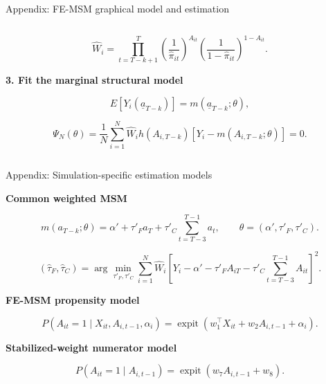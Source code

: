\documentclass[aspectratio=169,12pt]{beamer}
\newcommand{\muted}[1]{\textcolor{PrimerMuted}{#1}}
\newcommand{\pstrong}[1]{{\bfseries #1}}
\newcommand{\arrowtext}[1]{\par\vspace{0.45em}\noindent{\fontsize{10}{12}\selectfont $\to$}\hspace{0.45em}{#1}\par}
\newcommand{\smallref}[1]{\vspace{0.15cm}{\fontsize{5.8}{7}\selectfont\muted{#1}}}
\begin{document}
\begin{frame}{Appendix: FE-MSM graphical model and estimation}
\begin{columns}[T,onlytextwidth]
\begin{column}{0.50\textwidth}
{\vspace{-0.20cm}
\[
\widehat W_i
=
\prod_{t=T-k+1}^{T}
\left(\frac{1}{\hat\pi_{it}}\right)^{A_{it}}
\left(\frac{1}{1-\hat\pi_{it}}\right)^{1-A_{it}}.
\]

\vspace{0.05cm}
\pstrong{3. Fit the marginal structural model}

\vspace{-0.18cm}
\[
E[Y_i(\underline{a}_{T-k})]=m(\underline{a}_{T-k};\theta),
\]

\vspace{-0.18cm}
\[
\Psi_N(\theta)
=
\frac{1}{N}\sum_{i=1}^{N}
\widehat W_i
h(A_{i,T-k})
\left[
Y_i-m(A_{i,T-k};\theta)
\right]
=0.
\]

\vspace{-0.25cm}
\arrowtext{For a linear MSM, this last step reduces to a weighted least squares regression of \(Y_i\) on the truncated treatment history.}

}

\end{column}

\end{columns}

\smallref{Appendix detail: FE-MSM controls for time-invariant unmeasured confounding by putting \(\alpha_i\) in the propensity model, then using the resulting weights in the MSM.}

\end{frame}

\begin{frame}{Appendix: Simulation-specific estimation models}
\vspace{-0.2cm}
{\fontsize{7.4}{8.8}\selectfont

\textbf{Common weighted MSM}

\[
m(a_{T-k};\theta)
=
\alpha'
+
\tau'_F a_T
+
\tau'_C
\sum_{t=T-3}^{T-1} a_t ,
\qquad
\theta=(\alpha',\tau'_F,\tau'_C).
\]

\[
(\hat\tau_F,\hat\tau_C)
=
\arg\min_{\tau'_F,\tau'_C}
\sum_{i=1}^N
\widehat W_i
\left[
Y_i-\alpha'
-\tau'_F A_{iT}
-\tau'_C\sum_{t=T-3}^{T-1}A_{it}
\right]^2 .
\]

\vspace{0.15cm}

\textbf{FE-MSM propensity model}

\[
P(A_{it}=1\mid X_{it},A_{i,t-1},\alpha_i)
=
\operatorname{expit}
\left(
w_1^\top X_{it}
+
w_2 A_{i,t-1}
+
\alpha_i
\right).
\]

\vspace{0.15cm}

\textbf{Stabilized-weight numerator model}

\[
P(A_{it}=1\mid A_{i,t-1})
=
\operatorname{expit}
\left(
w_7 A_{i,t-1}+w_8
\right).
\]

}
\end{frame}
\end{document}

